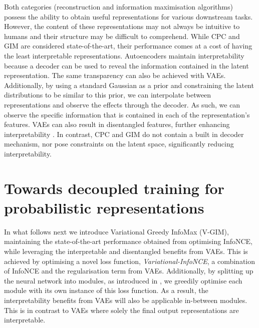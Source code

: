 		
		Both categories (reconstruction and information maximisation algorithms) possess the ability to obtain useful representations for various downstream tasks. However, the content of these representations may not always be intuitive to humans and their structure may be difficult to comprehend. While CPC and GIM are considered state-of-the-art, their performance comes at a cost of having the least interpretable representations. Autoencoders maintain interpretability because a decoder can be used to reveal the information contained in the latent representation. The same transparency can also be achieved with VAEs. Additionally, by using a standard Gaussian as a prior and constraining the latent distributions to be similar to this prior, we can interpolate between representations and observe the effects through the decoder. As such, we can observe the specific information that is contained in each of the representation's features. VAEs can also result in disentangled features, further enhancing interpretability \citep{grossuttiDeepLearningInfrared2022}. In contrast, CPC and GIM do not contain a built in decoder mechanism, nor pose constraints on the latent space, significantly reducing interpretability.
		


\section{Towards decoupled training for probabilistic representations} \label{cha:vgim_decoupled_training_for_probabil_repr}
		In what follows next we introduce Variational Greedy InfoMax (V-GIM), maintaining the state-of-the-art performance obtained from optimising InfoNCE, while leveraging the interpretable and disentangled benefits from VAEs. This is achieved by optimising a novel loss function, \textit{Variational-InfoNCE}, a combination of InfoNCE and the regularisation term from VAEs. Additionally, by splitting up the neural network into modules, as introduced in \citep{lowePuttingEndEndtoEnd2020}, we greedily optimise each module with its own instance of this loss function. As a result, the interpretability benefits from VAEs will also be applicable in-between modules. This is in contrast to VAEs where solely the final output representations are interpretable.		
				
		

